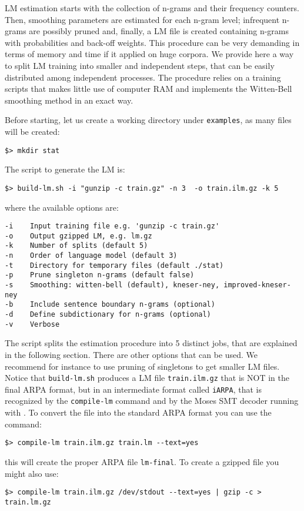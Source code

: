 LM estimation starts with the collection of n-grams and their frequency counters. Then, 
smoothing parameters are estimated for each n-gram level; infrequent n-grams are
possibly pruned and, finally, a LM file is created containing n-grams with probabilities and 
back-off weights.  This procedure can be very demanding in terms of memory and
time if it applied on huge corpora.   We provide here a way to split LM training  into smaller and independent steps, that can be easily distributed among independent processes. The  
procedure relies on a training scripts that makes little use of computer RAM and implements 
the  Witten-Bell smoothing method in an exact way.  

\noindent
Before starting, let us create a working directory under {\tt examples}, as many files will be created:

\begin{verbatim}
$> mkdir stat
\end{verbatim}

The script to generate the LM is:

\begin{verbatim}
$> build-lm.sh -i "gunzip -c train.gz" -n 3  -o train.ilm.gz -k 5
\end{verbatim}
where the available options are:

\begin{verbatim}
-i    Input training file e.g. 'gunzip -c train.gz'
-o    Output gzipped LM, e.g. lm.gz
-k    Number of splits (default 5)
-n    Order of language model (default 3)
-t    Directory for temporary files (default ./stat)
-p    Prune singleton n-grams (default false)
-s    Smoothing: witten-bell (default), kneser-ney, improved-kneser-ney 
-b    Include sentence boundary n-grams (optional)
-d    Define subdictionary for n-grams (optional)
-v    Verbose
\end{verbatim}

\noindent
The script splits the estimation procedure into 5 distinct jobs, that are explained in
the following section. There are other options that can be used. We recommend for instance to use pruning of singletons to get smaller LM files. 
Notice that {\tt build-lm.sh} produces a LM file {\tt train.ilm.gz} that is NOT in the final ARPA format, but in
an intermediate format called {\tt iARPA}, that is recognized by the {\tt compile-lm} 
command and by the Moses SMT decoder running with {\IRSTLM}. 
To convert the file into the standard ARPA format you can use the command:

\begin{verbatim}
$> compile-lm train.ilm.gz train.lm --text=yes
\end{verbatim}
this will create the proper ARPA file {\tt lm-final}.
To create a gzipped file you might also use:
\begin{verbatim}
$> compile-lm train.ilm.gz /dev/stdout --text=yes | gzip -c > train.lm.gz
\end{verbatim}


